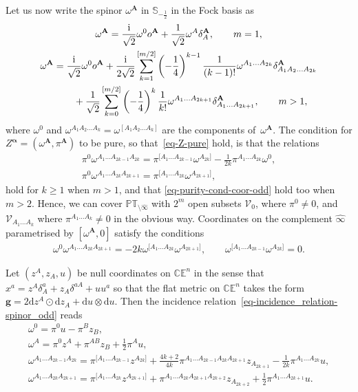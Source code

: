\documentclass[10pt,a4paper]{amsart}
\numberwithin{equation}{section}
\newcommand{\mbf} [1]{\mathbf{#1}}
\newcommand{\mc} [1]{\mathcal{#1}}
\newcommand{\dd} {\mathrm{d}}
\newcommand{\ii} {\mathrm{i}}
\newcommand{\PT} {\mathbb{PT}}
\newcommand{\Ss} {\mathbb{S}}
\newcommand{\E} {\mathbb{E}}
\newcommand{\C} {\mathbb{C}}
\begin{document}
Let us now write the spinor $\omega^\mbf{A}$ in $\Ss_{-\frac{1}{2}}$ in the Fock basis as
\begin{gather}
\omega^{\mbf{A}} = \frac{\ii}{\sqrt{2}} \omega^0 o^{\mbf{A}} + \frac{1}{\sqrt{2}} \omega^A \delta_A^{\mbf{A}} , \qquad m = 1 ,\nonumber \\
\omega^{\mbf{A}} = \frac{\ii}{\sqrt{2}} \omega^0 o^{\mbf{A}}
+ \frac{\ii}{2\sqrt{2}} \sum_{k=1}^{[m/2]}\left(- \frac{1}{4}\right)^{k-1} \frac{1}{(k-1)!} \omega^{A_1\ldots A_{2k}} \delta_{A_1A_2\ldots A_{2k}}^{\mbf{A}}
\nonumber\\
\hphantom{\omega^{\mbf{A}} =}{} + \frac{1}{\sqrt{2}}\sum_{k=0}^{[m/2]}\left(- \frac{1}{4}\right)^k \frac{1}{k!} \omega^{A_1 \ldots A_{2k+1}} \delta_{A_1 \ldots A_{2k+1}}^{\mbf{A}} , \qquad m > 1 ,\label{eq-hom2gen-om_odd}
\end{gather}
where $\omega^0$ and $\omega^{A_1A_2\ldots A_{k}} = \omega^{[A_1A_2\ldots A_{k}]}$ are the components of~$\omega^\mbf{A}$. The condition for $Z^{\bm{\upalpha}}=(\omega^\mbf{A}, \pi^\mbf{A})$ to be pure, so that~\eqref{eq-Z-pure} hold, is that the relations
\begin{gather*}
\pi^0 \omega^{A_1 \ldots A_{2k-1} A_{2k}} = \pi^{[A_1 \ldots A_{2k-1}} \omega^{A_{2k}]} - \tfrac{1}{2k} \pi^{A_1 \ldots A_{2k}} \omega^0 , \\
\pi^0 \omega^{A_1 \ldots A_{2k} A_{2k+1}} = \pi ^{[A_1 \ldots A_{2k}} \omega^{A_{2k+1}]} ,
\end{gather*}
hold for $k\geq1$ when $m>1$, and that \eqref{eq-purity-cond-coor-odd} hold too when $m>2$. Hence, we can cover $\PT_{\setminus \widehat{\infty}}$ with $2^m$ open subsets $\mc{V}_0$, where $\pi^0 \neq 0$, and $\mc{V}_{A_1 \ldots A_{k}}$ where $\pi^{A_1 \ldots A_{k}} \neq 0$ in the obvious way. Coordinates on the complement $\widehat{\infty}$ parametrised by $[\omega^\mbf{A},0]$ satisfy the conditions
\begin{gather*}
\omega^0 \omega^{A_1 \ldots A_{2k} A_{2k+1}}= - 2k \omega^{[A_1 \ldots A_{2k}} \omega^{A_{2k+1}]},\qquad \omega^{[A_1 \ldots A_{2k-1}} \omega^{A_{2k}]} = 0 .
\end{gather*}

Let $( z^A,z_A, u )$ be null coordinates on $\C \E^n$ in the sense that $x^a = z^A \delta^a_A + z_A \delta^{aA} + u u^a$ so that the f\/lat metric on $\C \E^n$ takes the form $\bm{g} = 2 \dd z^{A} \odot \dd z_{A} + \dd u \otimes \dd u$. Then the incidence rela\-tion~\eqref{eq-incidence_relation-spinor_odd} reads
\begin{gather*}
\omega^0 = \pi^0 u - \pi^B z_B , \\
\omega^A = \pi^0 z^A + \pi^{AB} z_B + \tfrac{1}{2} \pi^A u , \\
\omega^{A_1 \ldots A_{2k-1} A_{2k}} = \pi^{[A_1 \ldots A_{2k-1}} z^{A_{2k}]} + \tfrac{4k+2}{4k} \pi^{A_1 \ldots A_{2k-1} A_{2k} A_{2k+1}} z_{A_{2k+1}} - \tfrac{1}{2k} \pi^{A_1 \ldots A_{2k}} u , \\
\omega^{A_1 \ldots A_{2k} A_{2k+1}} = \pi^{[A_1 \ldots A_{2k}} z^{A_{2k+1}]} + \pi^{A_1 \ldots A_{2k} A_{2k+1} A_{2k+2}} z_{A_{2k+2}} + \tfrac{1}{2} \pi^{A_1 \ldots A_{2k+1}} u .
\end{gather*}
\end{document}
